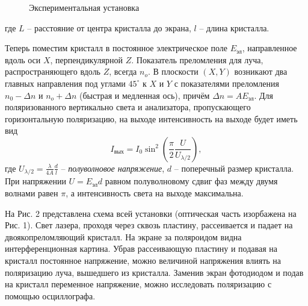 \documentclass[12pt, a4paper]{article}
\begin{document}
\begin{figure}[h]
    \caption{\centering Экспериментальная установка}
    \label{fig:image1}
\end{figure}

где $L$ -- расстояние от центра кристалла до экрана, $l$ -- длина кристалла.

Теперь поместим кристалл в постоянное электрическое поле $E_{\text{эл}}$,
направленное вдоль оси $X$, перпендикулярной $Z$. Показатель преломления для
луча, распространяющего вдоль $Z$, всегда $n_o$. В плоскости $(X,Y)$ возникают
два главных направления под углами $45^\circ$ к $X$ и $Y$ с показателями
преломления $n_0 - \Delta n$ и $n_o + \Delta n$ (быстрая и медленная ось),
причём $\Delta n = A E_{\text{эл}}$. Для поляризованного вертикально света и
анализатора, пропускающего горизонтальную поляризацию, на выходе интенсивность
на выходе будет иметь вид
\begin{equation}
    I_{\text{вых}} = I_0 \sin^2 \left(\dfrac{\pi}{2} \dfrac{U}{U_{\lambda/2}} \right),
\end{equation}
где $\displaystyle U_{\lambda/2} = \frac{\lambda}{4A}\frac{d}{l}$ -- \textit{полуволновое напряжение}, $d$ -- поперечный размер кристалла.  При напряжении $U = E_{\text{эл}}d$ равном полуволновому сдвиг фаз между двумя волнами равен $\pi$, а интенсивность света на выходе максимальна.

На Рис. 2 представлена схема всей установки (оптическая часть изорбажена на
Рис. 1). Свет лазера, проходя через сквозь пластину, рассеивается и падает на
двоякопреломляющий кристалл. На экране за поляроидом видна интерференционная
картина. Убрав рассеивающую пластину и подавая на кристалл постоянное
напряжение, можно величиной напряжения влиять на поляризацию луча, вышедшего из
кристалла. Заменив экран фотодиодом и подав на кристалл переменное напряжение,
можно исследовать поляризацию с помощью осциллографа.
\end{document}
